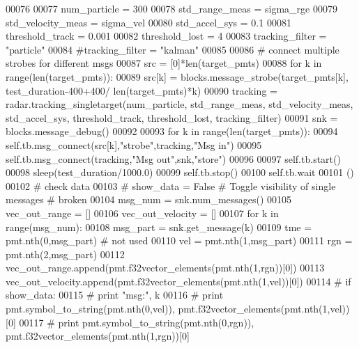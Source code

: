 \begin{DoxyCode}
00076         
00077         num\_particle = 300
00078         std\_range\_meas = sigma\_rge
00079         std\_velocity\_meas = sigma\_vel
00080         std\_accel\_sys = 0.1
00081         threshold\_track = 0.001
00082         threshold\_lost = 4
00083         tracking\_filter = \textcolor{stringliteral}{"particle"}
00084         \textcolor{comment}{#tracking\_filter = "kalman"}
00085         
00086         \textcolor{comment}{# connect multiple strobes for different msgs}
00087         src = [0]*len(target\_pmts)
00088         \textcolor{keywordflow}{for} k \textcolor{keywordflow}{in} range(len(target\_pmts)):
00089             src[k] = blocks.message\_strobe(target\_pmts[k], test\_duration-400+400/
      len(target\_pmts)*k)
00090         tracking = radar.tracking\_singletarget(num\_particle, std\_range\_meas, std\_velocity\_meas, 
      std\_accel\_sys, threshold\_track, threshold\_lost, tracking\_filter)
00091         snk = blocks.message\_debug()
00092         
00093         \textcolor{keywordflow}{for} k \textcolor{keywordflow}{in} range(len(target\_pmts)):
00094             self.tb.msg\_connect(src[k],\textcolor{stringliteral}{"strobe"},tracking,\textcolor{stringliteral}{"Msg in"})
00095         self.tb.msg\_connect(tracking,\textcolor{stringliteral}{"Msg out"},snk,\textcolor{stringliteral}{"store"})
00096         
00097         self.tb.start()
00098         sleep(test\_duration/1000.0)
00099         self.tb.stop()
00100         self.tb.wait
00101         ()
00102         \textcolor{comment}{# check data}
00103 \textcolor{comment}{#       show\_data = False # Toggle visibility of single messages # broken}
00104         msg\_num = snk.num\_messages()
00105         vec\_out\_range = []
00106         vec\_out\_velocity = []
00107         \textcolor{keywordflow}{for} k \textcolor{keywordflow}{in} range(msg\_num):
00108             msg\_part = snk.get\_message(k)
00109             tme = pmt.nth(0,msg\_part) \textcolor{comment}{# not used}
00110             vel = pmt.nth(1,msg\_part)
00111             rgn = pmt.nth(2,msg\_part)
00112             vec\_out\_range.append(pmt.f32vector\_elements(pmt.nth(1,rgn))[0])
00113             vec\_out\_velocity.append(pmt.f32vector\_elements(pmt.nth(1,vel))[0])
00114 \textcolor{comment}{#           if show\_data:}
00115 \textcolor{comment}{#               print "msg:", k}
00116 \textcolor{comment}{#               print pmt.symbol\_to\_string(pmt.nth(0,vel)), pmt.f32vector\_elements(pmt.nth(1,vel))[0]}
00117 \textcolor{comment}{#               print pmt.symbol\_to\_string(pmt.nth(0,rgn)), pmt.f32vector\_elements(pmt.nth(1,rgn))[0]}

\end{DoxyCode}
